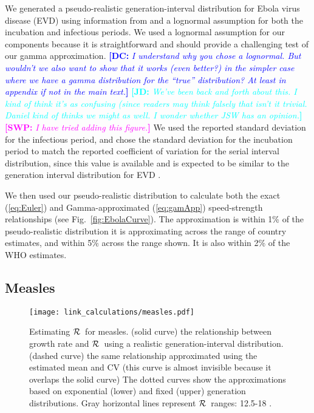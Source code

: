 \documentclass[12pt]{article}
\newcommand{\RR}{\ensuremath{{\cal R}}}
\newcommand{\eref}[1]{(\ref{eq:#1})}
\newcommand{\fref}[1]{Fig.~\ref{fig:#1}}
\newcommand{\comment}[3]{\textcolor{#1}{\textbf{[#2: }\textit{#3}\textbf{]}}}
\newcommand{\jd}[1]{\comment{cyan}{JD}{#1}}
\newcommand{\swp}[1]{\comment{magenta}{SWP}{#1}}
\newcommand{\dc}[1]{\comment{blue}{DC}{#1}}
\begin{document}
We generated a pseudo-realistic generation-interval distribution for Ebola virus disease (EVD) using information from \cite{AylwBarb14} and a lognormal assumption for both the incubation and infectious periods.
We used a lognormal assumption for our components because it is straightforward and should provide a challenging test of our gamma approximation. 
\dc{I understand why you chose a lognormal. But wouldn't we also want to show that it works (even better?) in the simpler case where we have a gamma distribution for the ``true'' distribution? At least in appendix if not in the main text.}
\jd{We've been back and forth about this. I kind of think it's as confusing (since readers may think falsely that isn't it trivial. Daniel kind of thinks we might as well. I wonder whether JSW has an opinion.}
\swp{I have tried adding this figure.}
We used the reported standard deviation for the infectious period, and chose the standard deviation for the incubation period to match the reported coefficient of variation for the serial interval distribution, since this value is available and is expected to be similar to the generation interval distribution for EVD \cite{AylwBarb14}.

We then used our pseudo-realistic distribution to calculate both the exact \eref{Euler} and Gamma-approximated \eref{gamApp} speed-strength relationships (see \fref{EbolaCurve}). The approximation is within 1\% of the pseudo-realistic distribution it is approximating across the range of country estimates, and within 5\% across the range shown. It is also within 2\% of the WHO estimates. 

\subsection{Measles}
\label{MeaslesEx}

\begin{figure}[htbp] \centering
	\texttt{[image: link\_calculations/measles.pdf]}
	\caption{Estimating \RR~for measles.
		(solid curve) the relationship between growth rate and \RR~using a realistic generation-interval distribution.
		(dashed curve) the same relationship approximated using the estimated mean and CV (this curve is almost invisible because it overlaps the solid curve)
		The dotted curves show the approximations based on exponential (lower) and fixed (upper) generation distributions.
		Gray horizontal lines represent \RR\ ranges: 12.5-18 \cite{anderson1982directly}.
	}
	\label{fig:measlesCurve}
\end{figure}
\end{document}
